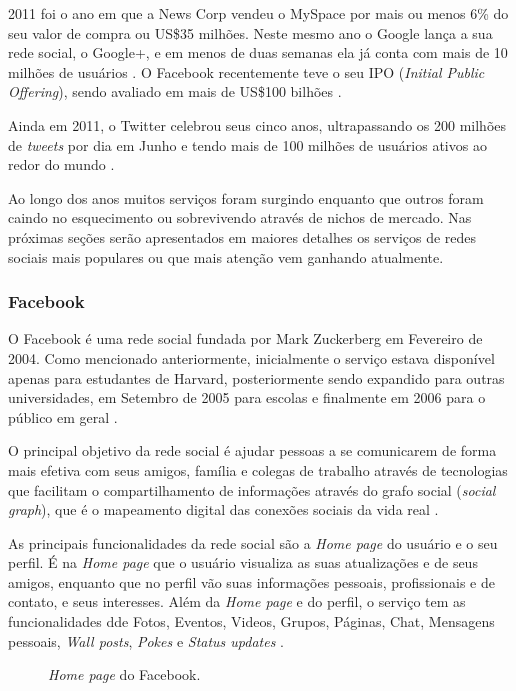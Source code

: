\documentclass[diss]{template/setrem}
\begin{document}
2011 foi o ano em que a News Corp vendeu o MySpace por mais ou menos 6\% do seu valor de compra ou US\$35 milhões. Neste mesmo ano o Google lança a sua rede social, o Google+, e em menos de duas semanas ela já conta com mais de 10 milhões de usuários \citep{Mofo2011}. O Facebook recentemente teve o seu IPO (\emph{Initial Public Offering}), sendo avaliado em mais de US\$100 bilhões \citep{Ghosh2012}.

Ainda em 2011, o Twitter celebrou seus cinco anos, ultrapassando os 200 milhões de \emph{tweets} por dia em Junho e tendo mais de 100 milhões de usuários ativos ao redor do mundo \citep{Parr2011}.

Ao longo dos anos muitos serviços foram surgindo enquanto que outros foram caindo no esquecimento ou sobrevivendo através de nichos de mercado. Nas próximas seções serão apresentados em maiores detalhes os serviços de redes sociais mais populares ou que mais atenção vem ganhando atualmente.

\subsubsection{Facebook}
O Facebook é uma rede social fundada por Mark Zuckerberg em Fevereiro de 2004. Como mencionado anteriormente, inicialmente o serviço estava disponível apenas para estudantes de Harvard, posteriormente sendo expandido para outras universidades, em Setembro de 2005 para escolas e finalmente em 2006 para o público em geral \citep{CrunchBase2011}.

O principal objetivo da rede social é ajudar pessoas a se comunicarem de forma mais efetiva com seus amigos, família e colegas de trabalho através de tecnologias que facilitam o compartilhamento de informações através do grafo social (\emph{social graph}), que é o mapeamento digital das conexões sociais da vida real \citep{Facebook2012a}.

As principais funcionalidades da rede social são a \emph{Home page} do usuário e o seu perfil. É na \emph{Home page} que o usuário visualiza as suas atualizações e de seus amigos, enquanto que no perfil vão suas informações pessoais, profissionais e de contato, e seus interesses. Além da \emph{Home page} e do perfil, o serviço tem as funcionalidades dde Fotos, Eventos, Videos, Grupos, Páginas, Chat, Mensagens pessoais, \emph{Wall posts}, \emph{Pokes} e \emph{Status updates} \citep{Facebook2012a}.

\begin{figure}[!h]
    \caption{\emph{Home page} do Facebook.}
    \label{fig:facebook-home}
\end{figure}
\end{document}
